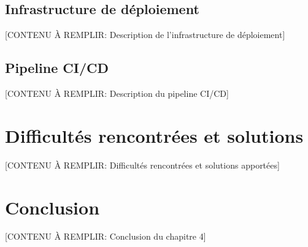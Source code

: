 \subsection{Infrastructure de déploiement}

[CONTENU À REMPLIR: Description de l'infrastructure de déploiement]


\subsection{Pipeline CI/CD}

[CONTENU À REMPLIR: Description du pipeline CI/CD]

\section{Difficultés rencontrées et solutions}


[CONTENU À REMPLIR: Difficultés rencontrées et solutions apportées]


\section*{Conclusion}


[CONTENU À REMPLIR: Conclusion du chapitre 4]
